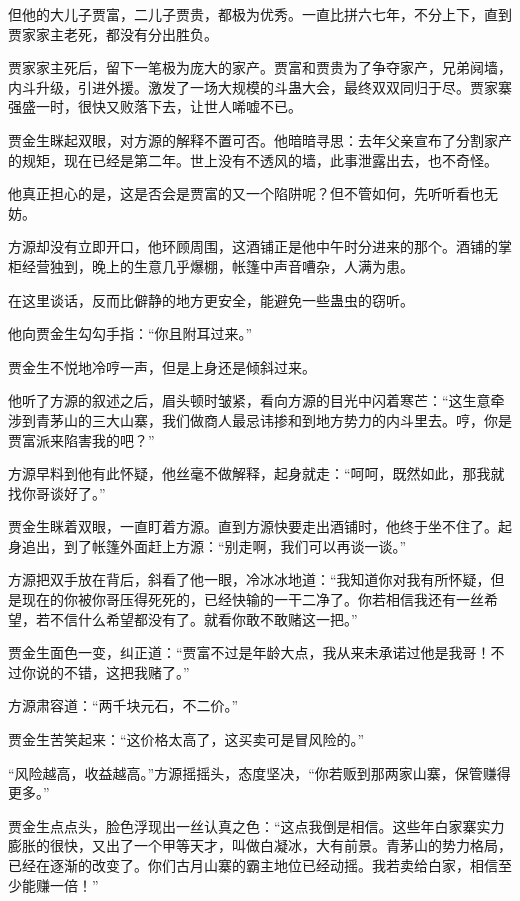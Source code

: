 \begin{this_body}
但他的大儿子贾富，二儿子贾贵，都极为优秀。一直比拼六七年，不分上下，直到贾家家主老死，都没有分出胜负。

贾家家主死后，留下一笔极为庞大的家产。贾富和贾贵为了争夺家产，兄弟阋墙，内斗升级，引进外援。激发了一场大规模的斗蛊大会，最终双双同归于尽。贾家寨强盛一时，很快又败落下去，让世人唏嘘不已。

贾金生眯起双眼，对方源的解释不置可否。他暗暗寻思：去年父亲宣布了分割家产的规矩，现在已经是第二年。世上没有不透风的墙，此事泄露出去，也不奇怪。

他真正担心的是，这是否会是贾富的又一个陷阱呢？但不管如何，先听听看也无妨。

方源却没有立即开口，他环顾周围，这酒铺正是他中午时分进来的那个。酒铺的掌柜经营独到，晚上的生意几乎爆棚，帐篷中声音嘈杂，人满为患。

在这里谈话，反而比僻静的地方更安全，能避免一些蛊虫的窃听。

他向贾金生勾勾手指：“你且附耳过来。”

贾金生不悦地冷哼一声，但是上身还是倾斜过来。

他听了方源的叙述之后，眉头顿时皱紧，看向方源的目光中闪着寒芒：“这生意牵涉到青茅山的三大山寨，我们做商人最忌讳掺和到地方势力的内斗里去。哼，你是贾富派来陷害我的吧？”

方源早料到他有此怀疑，他丝毫不做解释，起身就走：“呵呵，既然如此，那我就找你哥谈好了。”

贾金生眯着双眼，一直盯着方源。直到方源快要走出酒铺时，他终于坐不住了。起身追出，到了帐篷外面赶上方源：“别走啊，我们可以再谈一谈。”

方源把双手放在背后，斜看了他一眼，冷冰冰地道：“我知道你对我有所怀疑，但是现在的你被你哥压得死死的，已经快输的一干二净了。你若相信我还有一丝希望，若不信什么希望都没有了。就看你敢不敢赌这一把。”

贾金生面色一变，纠正道：“贾富不过是年龄大点，我从来未承诺过他是我哥！不过你说的不错，这把我赌了。”

方源肃容道：“两千块元石，不二价。”

贾金生苦笑起来：“这价格太高了，这买卖可是冒风险的。”

“风险越高，收益越高。”方源摇摇头，态度坚决，“你若贩到那两家山寨，保管赚得更多。”

贾金生点点头，脸色浮现出一丝认真之色：“这点我倒是相信。这些年白家寨实力膨胀的很快，又出了一个甲等天才，叫做白凝冰，大有前景。青茅山的势力格局，已经在逐渐的改变了。你们古月山寨的霸主地位已经动摇。我若卖给白家，相信至少能赚一倍！”


\end{this_body}
